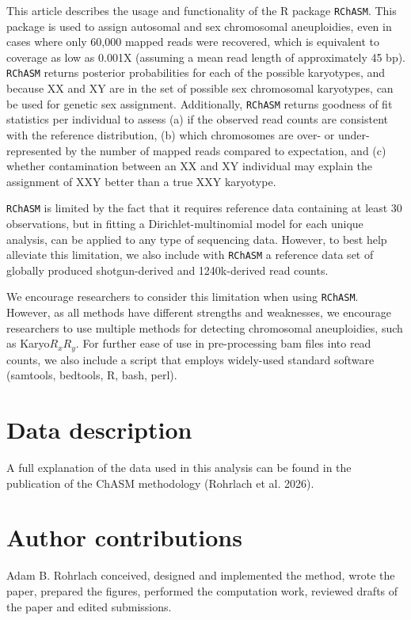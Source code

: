\documentclass[
  letterpaper,
  DIV=11,
  numbers=noendperiod]{scrartcl}
\begin{document}
This article describes the usage and functionality of the R package
\texttt{RChASM}. This package is used to assign autosomal and sex
chromosomal aneuploidies, even in cases where only 60,000 mapped reads
were recovered, which is equivalent to coverage as low as 0.001X
(assuming a mean read length of approximately 45 bp). \texttt{RChASM}
returns posterior probabilities for each of the possible karyotypes, and
because XX and XY are in the set of possible sex chromosomal karyotypes,
can be used for genetic sex assignment. Additionally, \texttt{RChASM}
returns goodness of fit statistics per individual to assess (a) if the
observed read counts are consistent with the reference distribution, (b)
which chromosomes are over- or under-represented by the number of mapped
reads compared to expectation, and (c) whether contamination between an
XX and XY individual may explain the assignment of XXY better than a
true XXY karyotype.

\texttt{RChASM} is limited by the fact that it requires reference data
containing at least 30 observations, but in fitting a
Dirichlet-multinomial model for each unique analysis, can be applied to
any type of sequencing data. However, to best help alleviate this
limitation, we also include with \texttt{RChASM} a reference data set of
globally produced shotgun-derived and 1240k-derived read counts.

We encourage researchers to consider this limitation when using
\texttt{RChASM}. However, as all methods have different strengths and
weaknesses, we encourage researchers to use multiple methods for
detecting chromosomal aneuploidies, such as Karyo\(R_{x}R_{y}\). For
further ease of use in pre-processing bam files into read counts, we
also include a script that employs widely-used standard software
(samtools, bedtools, R, bash, perl).

\section{Data description}\label{data-description}

A full explanation of the data used in this analysis can be found in the
publication of the ChASM methodology (Rohrlach et al. 2026).

\section{Author contributions}\label{author-contributions}

Adam B. Rohrlach conceived, designed and implemented the method, wrote
the paper, prepared the figures, performed the computation work,
reviewed drafts of the paper and edited submissions.
\end{document}
